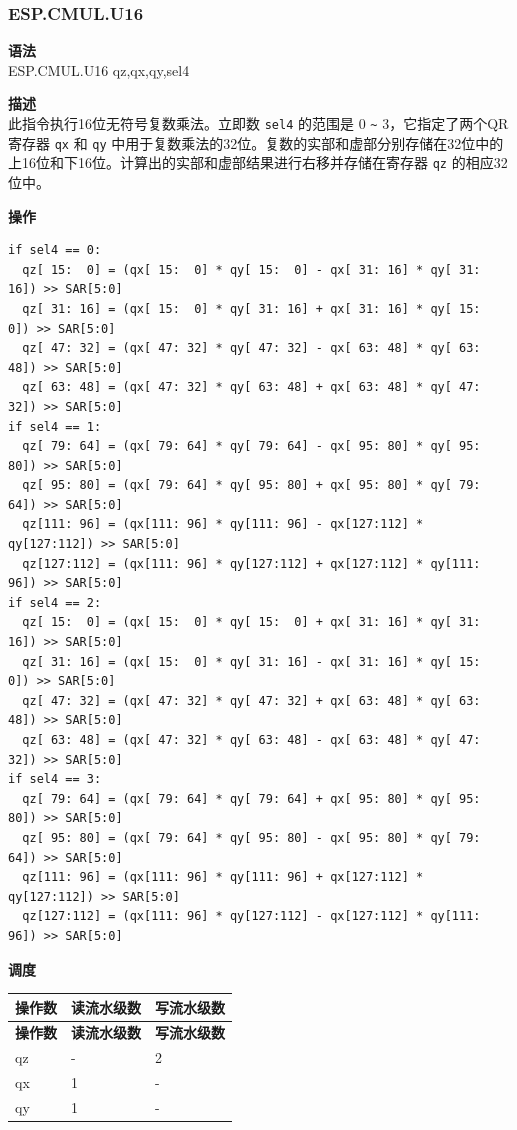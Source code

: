\newpage
\subsubsection{ESP.CMUL.U16}\label{instruction:ESPCMULU16}
\textbf{语法}\\
ESP.CMUL.U16 qz,qx,qy,sel4

\textbf{描述}\\
此指令执行16位无符号复数乘法。立即数 \lstinline{sel4} 的范围是 0 \verb+~+ 3，它指定了两个QR寄存器 \lstinline{qx} 和 \lstinline{qy} 中用于复数乘法的32位。复数的实部和虚部分别存储在32位中的上16位和下16位。计算出的实部和虚部结果进行右移并存储在寄存器 \lstinline{qz} 的相应32位中。

\textbf{操作}\\
\begin{lstlisting}
if sel4 == 0:
  qz[ 15:  0] = (qx[ 15:  0] * qy[ 15:  0] - qx[ 31: 16] * qy[ 31: 16]) >> SAR[5:0]
  qz[ 31: 16] = (qx[ 15:  0] * qy[ 31: 16] + qx[ 31: 16] * qy[ 15:  0]) >> SAR[5:0]
  qz[ 47: 32] = (qx[ 47: 32] * qy[ 47: 32] - qx[ 63: 48] * qy[ 63: 48]) >> SAR[5:0]
  qz[ 63: 48] = (qx[ 47: 32] * qy[ 63: 48] + qx[ 63: 48] * qy[ 47: 32]) >> SAR[5:0]
if sel4 == 1:
  qz[ 79: 64] = (qx[ 79: 64] * qy[ 79: 64] - qx[ 95: 80] * qy[ 95: 80]) >> SAR[5:0]
  qz[ 95: 80] = (qx[ 79: 64] * qy[ 95: 80] + qx[ 95: 80] * qy[ 79: 64]) >> SAR[5:0]
  qz[111: 96] = (qx[111: 96] * qy[111: 96] - qx[127:112] * qy[127:112]) >> SAR[5:0]
  qz[127:112] = (qx[111: 96] * qy[127:112] + qx[127:112] * qy[111: 96]) >> SAR[5:0]
if sel4 == 2:
  qz[ 15:  0] = (qx[ 15:  0] * qy[ 15:  0] + qx[ 31: 16] * qy[ 31: 16]) >> SAR[5:0]
  qz[ 31: 16] = (qx[ 15:  0] * qy[ 31: 16] - qx[ 31: 16] * qy[ 15:  0]) >> SAR[5:0]
  qz[ 47: 32] = (qx[ 47: 32] * qy[ 47: 32] + qx[ 63: 48] * qy[ 63: 48]) >> SAR[5:0]
  qz[ 63: 48] = (qx[ 47: 32] * qy[ 63: 48] - qx[ 63: 48] * qy[ 47: 32]) >> SAR[5:0]
if sel4 == 3:
  qz[ 79: 64] = (qx[ 79: 64] * qy[ 79: 64] + qx[ 95: 80] * qy[ 95: 80]) >> SAR[5:0]
  qz[ 95: 80] = (qx[ 79: 64] * qy[ 95: 80] - qx[ 95: 80] * qy[ 79: 64]) >> SAR[5:0]
  qz[111: 96] = (qx[111: 96] * qy[111: 96] + qx[127:112] * qy[127:112]) >> SAR[5:0]
  qz[127:112] = (qx[111: 96] * qy[127:112] - qx[127:112] * qy[111: 96]) >> SAR[5:0]
\end{lstlisting}



\textbf{调度}\\
\begin{longtable}[c]{|l|l|l|}
    \hline
    \rowcolor{lightgray}
    \textbf{操作数} & \textbf{读流水级数} & \textbf{写流水级数} \\\hline
    \endfirsthead
    \hline
    \rowcolor{lightgray}
     \textbf{操作数} & \textbf{读流水级数} & \textbf{写流水级数} \\\hline
    \endhead
    \hline
    \endfoot


    qz & - & 2 \\\hline
     qx & 1 & - \\\hline
     qy & 1 & -

\end{longtable}

